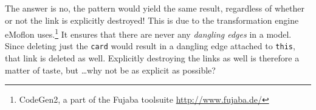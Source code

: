 The answer is no, the pattern would yield the same result, regardless of whether or not the link is explicitly destroyed! This is due to
the transformation engine eMoflon uses.\footnote{CodeGen2, a part of the Fujaba toolsuite \url{http://www.fujaba.de/}} It ensures that
there are never any \emph{dangling edges} in a model. Since deleting just the \texttt{card} would result in a dangling edge attached to \texttt{this}, that
link is deleted as well. Explicitly destroying the links as well is therefore a matter of taste, but \ldots why not be as explicit as possible?



